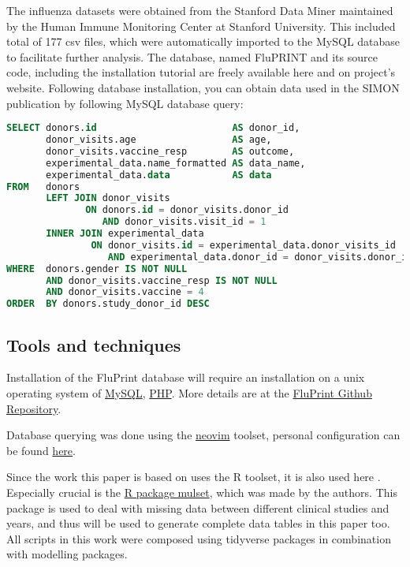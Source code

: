\begin{displayquote}
The influenza datasets were obtained from the Stanford Data Miner maintained by
    the Human Immune Monitoring Center at Stanford University. This included
    total of 177 csv files, which were automatically imported to the MySQL
    database to facilitate further analysis. The database, named FluPRINT and
    its source code, including the installation tutorial are freely available
    here and on project's website. Following database installation, you can
    obtain data used in the SIMON publication by following MySQL database
    query:
\end{displayquote}

\begin{lstlisting}[language=sql, caption=Query of initial SIMON data, label={lst:QueryTemplate}]
SELECT donors.id                        AS donor_id,
       donor_visits.age                 AS age,
       donor_visits.vaccine_resp        AS outcome,
       experimental_data.name_formatted AS data_name,
       experimental_data.data           AS data
FROM   donors
       LEFT JOIN donor_visits
              ON donors.id = donor_visits.donor_id
                 AND donor_visits.visit_id = 1
       INNER JOIN experimental_data
               ON donor_visits.id = experimental_data.donor_visits_id
                  AND experimental_data.donor_id = donor_visits.donor_id
WHERE  donors.gender IS NOT NULL
       AND donor_visits.vaccine_resp IS NOT NULL
       AND donor_visits.vaccine = 4
ORDER  BY donors.study_donor_id DESC
\end{lstlisting}

\subsection{Tools and techniques}

Installation of the FluPrint database will require an installation on a
unix operating system of \href{https://www.mysql.com/}{MySQL},
\href{https://www.php.net/manual/en/install.php}{PHP}. More details are at the
\href{https://github.com/LogIN-/fluprint}{FluPrint Github Repository}.

Database querying was done using the \href{https://neovim.io/}{neovim} toolset,
personal configuration can be found
\href{https://github.com/Vinkage/mike_neovim/tree/feature}{here}.

Since the work this paper is based on uses the R toolset, it is also used here
\citep{tomicFluPRINTDatasetMultidimensional2019,
tomicSIMONAutomatedMachine2019}.  Especially crucial is the
\href{https://cran.r-project.org/web/packages/mulset/index.html}{R package
mulset}, which was made by the authors. This package is used to deal with
missing data between different clinical studies and years, and thus will be
used to generate complete data tables in this paper too. All scripts in this
work were composed using tidyverse packages in combination with modelling
packages.

